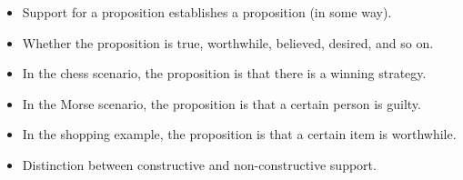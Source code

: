 \documentclass[10pt]{article}
\begin{document}
\begin{itemize}
\item Support for a proposition establishes a proposition (in some way).
\item Whether the proposition is true, worthwhile, believed, desired, and so on.
\item In the chess scenario, the proposition is that there is a winning strategy.
\item In the Morse scenario, the proposition is that a certain person is guilty.
\item In the shopping example, the proposition is that a certain item is worthwhile.
\end{itemize}

\begin{itemize}
\item Distinction between constructive and non-constructive support.
\end{itemize}
\end{document}
